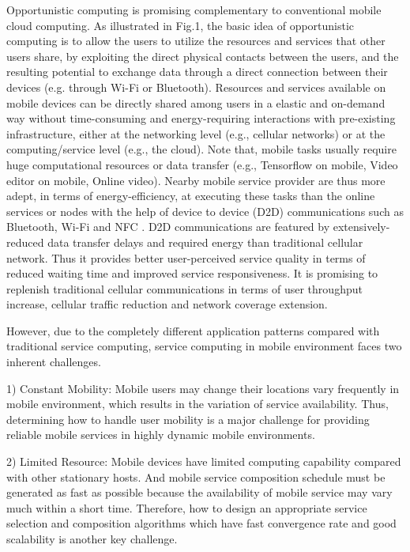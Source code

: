 \documentclass[10pt,journal,compsoc]{IEEEtran}
\begin{document}
Opportunistic computing is promising complementary to conventional mobile cloud computing. As illustrated in Fig.1, the basic idea of opportunistic computing is to allow the users to utilize the resources and services that other users share, by exploiting the direct physical contacts between the users, and the resulting potential to exchange data through a direct connection between their devices (e.g. through Wi-Fi or Bluetooth). Resources and services available on mobile devices can be directly shared among users in a elastic and on-demand way without time-consuming and energy-requiring interactions with pre-existing infrastructure, either at the networking level (e.g., cellular networks) or at the computing/service level (e.g., the cloud). 
Note that, mobile tasks usually require huge computational resources or data transfer (e.g., Tensorflow on mobile, Video editor on mobile, Online video). Nearby mobile service provider are thus more adept, in terms of energy-efficiency, at executing these tasks than the online services or nodes with the help of device
to device (D2D) communications such as Bluetooth, Wi-Fi and NFC \cite{balani2007energy}. D2D communications are featured by extensively-reduced data transfer delays and required energy than traditional cellular network. Thus it provides better user-perceived service quality in terms of reduced waiting time and improved service responsiveness. It is promising to replenish traditional cellular communications in terms of user throughput increase, cellular traffic reduction and network coverage extension. 

However, due to the completely different application patterns compared with traditional service computing, service computing in mobile environment faces two inherent challenges.

1) Constant Mobility: Mobile users may change their locations vary frequently in mobile environment, which results in the variation of service availability. Thus, determining how to handle user mobility is a major challenge for providing reliable mobile services in highly dynamic mobile environments.

2) Limited Resource: Mobile devices have limited computing capability compared with other stationary hosts. And mobile service composition schedule must be generated as fast as possible because the availability of mobile service may vary much within a short time. Therefore, how to design an appropriate service selection and composition algorithms which have fast convergence rate and good scalability is another key challenge.
\end{document}
